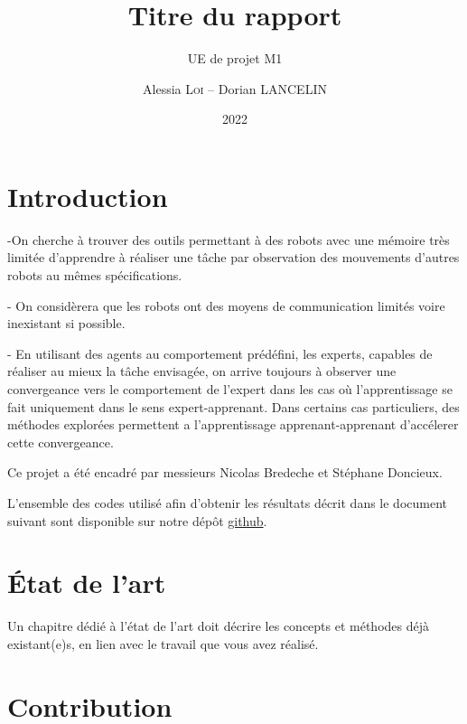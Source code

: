 \documentclass[a4paper, 12pt]{report}
\institute{Sorbonne Université}
\title{Titre du rapport}
\subtitle{UE de projet M1}
\author{Alessia \textsc{Loi} -- Dorian \textsc{LANCELIN}}
\date{2022}
\begin{document}
    \maketitle
    \romantableofcontents

    \chapter{Introduction}

    -On cherche à trouver des outils permettant à des robots avec une mémoire très limitée d'apprendre à réaliser une tâche par observation des mouvements d'autres robots au mêmes spécifications.
    
    - On considèrera que les robots ont des moyens de communication limités voire inexistant si possible.
    
    - En utilisant des agents au comportement prédéfini, les experts, capables de réaliser au mieux la tâche envisagée, on arrive toujours à observer une convergeance vers le comportement de l'expert dans les cas où l'apprentissage se fait uniquement dans le sens expert-apprenant.
    Dans certains cas particuliers, des méthodes explorées permettent a l'apprentissage apprenant-apprenant d'accélerer cette convergeance. 
    
    Ce projet a été encadré par messieurs Nicolas Bredeche et Stéphane Doncieux.  
    
    L'ensemble des codes utilisé afin d'obtenir les résultats décrit dans le document suivant sont disponible sur notre dépôt \href{https://github.com/aerrynn/M1_Projet_ASIRE}{github}. 

    \chapter{État de l'art}
    Un chapitre dédié à l'état de l'art doit décrire les concepts et méthodes déjà existant(e)s, en lien avec le travail que vous avez réalisé.
    
    \chapter{Contribution}
   
\end{document}
